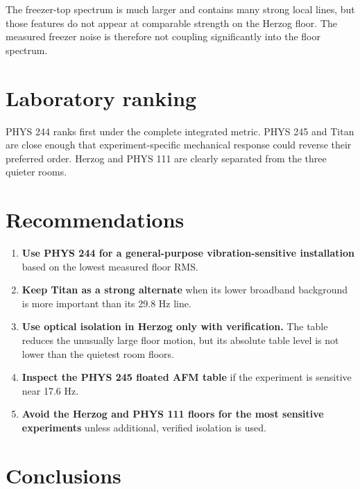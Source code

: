 \documentclass[11pt]{article}
\newcommand{\asdunit}{\si{\meter\per\second\squared\per\sqrthertz}}
\begin{document}
The freezer-top spectrum is much larger and contains many strong local lines,
but those features do not appear at comparable strength on the Herzog floor.
The measured freezer noise is therefore not coupling significantly into the
floor spectrum.

\section{Laboratory ranking}

\begin{table}[H]
\centering
\caption{Representative-floor ranking. Median ASD is in \asdunit.}
\scriptsize

\label{tab:ranking}
\end{table}

PHYS 244 ranks first under the complete integrated metric. PHYS 245 and Titan
are close enough that experiment-specific mechanical response could reverse
their preferred order. Herzog and PHYS 111 are clearly separated from the
three quieter rooms.

\section{Recommendations}

\begin{enumerate}
  \item \textbf{Use PHYS 244 for a general-purpose vibration-sensitive
  installation} based on the lowest measured floor RMS.
  \item \textbf{Keep Titan as a strong alternate} when its lower broadband
  background is more important than its 29.8 Hz line.
  \item \textbf{Use optical isolation in Herzog only with verification.}
  The table reduces the unusually large floor motion, but its absolute table
  level is not lower than the quietest room floors.
  \item \textbf{Inspect the PHYS 245 floated AFM table} if the experiment is
  sensitive near 17.6 Hz.
  \item \textbf{Avoid the Herzog and PHYS 111 floors for the most sensitive
  experiments} unless additional, verified isolation is used.
\end{enumerate}

\section{Conclusions}
\end{document}
